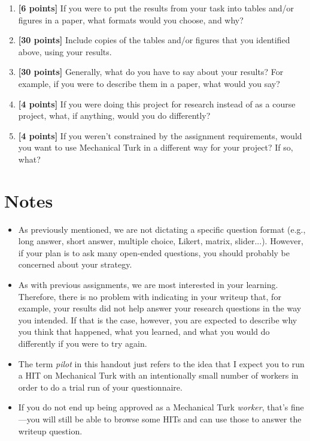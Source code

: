 \documentclass{article}
\begin{document}
\begin{enumerate}
     \item \textbf{[6 points]} If you were to put the results from your task into tables and/or figures in a paper, what formats would you choose, and why?
     
     \item \textbf{[30 points]} Include copies of the tables and/or figures that you identified above, using your results.
     
     \item \textbf{[30 points]} Generally, what do you have to say about your results? For example, if you were to describe them in a paper, what would you say?

     \item \textbf{[4 points]} If you were doing this project for research instead of as a course project, what, if anything, would you do differently?

     \item \textbf{[4 points]} If you weren't constrained by the assignment requirements, would you want to use Mechanical Turk in a different way for your project? If so, what? 
    
\end{enumerate}

\section*{Notes}
\begin{itemize}
    \item As previously mentioned, we are not dictating a specific question format (e.g., long answer, short answer, multiple choice, Likert, matrix, slider...). However, if your plan is to ask many open-ended questions, you should probably be concerned about your strategy.
    
    \item As with previous assignments, we are most interested in your learning. Therefore, there is no problem with indicating in your writeup that, for example, your results did not help answer your research questions in the way you intended. If that is the case, however, you are expected to describe why you think that happened, what you learned, and what you would do differently if you were to try again.
    
    \item The term \textit{pilot} in this handout just refers to the idea that I expect you to run a HIT on Mechanical Turk with an intentionally small number of workers in order to do a trial run of your questionnaire.
    
    \item If you do not end up being approved as a Mechanical Turk \textit{worker}, that's fine---you will still be able to browse some HITs and can use those to answer the writeup question.
\end{itemize}
\end{document}
